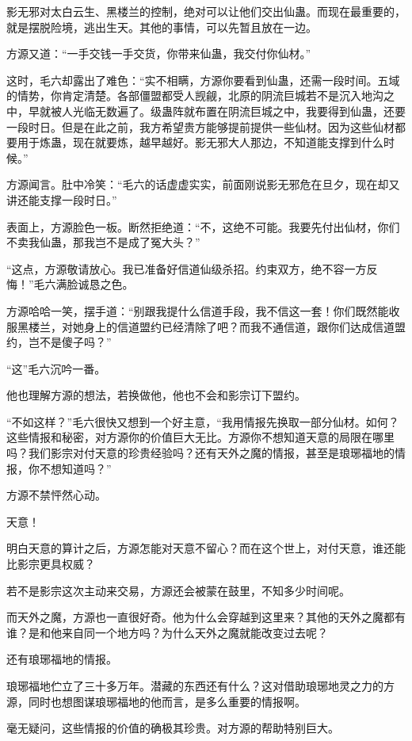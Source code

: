 \begin{this_body}
影无邪对太白云生、黑楼兰的控制，绝对可以让他们交出仙蛊。而现在最重要的，就是摆脱险境，逃出生天。其他的事情，可以先暂且放在一边。

方源又道：“一手交钱一手交货，你带来仙蛊，我交付你仙材。”

这时，毛六却露出了难色：“实不相瞒，方源你要看到仙蛊，还需一段时间。五域的情势，你肯定清楚。各部僵盟都受人觊觎，北原的阴流巨城若不是沉入地沟之中，早就被人光临无数遍了。级蛊阵就布置在阴流巨城之中，我要得到仙蛊，还要一段时日。但是在此之前，我方希望贵方能够提前提供一些仙材。因为这些仙材都要用于炼蛊，现在就要炼，越早越好。影无邪大人那边，不知道能支撑到什么时候。”

方源闻言。肚中冷笑：“毛六的话虚虚实实，前面刚说影无邪危在旦夕，现在却又讲还能支撑一段时日。”

表面上，方源脸色一板。断然拒绝道：“不，这绝不可能。我要先付出仙材，你们不卖我仙蛊，那我岂不是成了冤大头？”

“这点，方源敬请放心。我已准备好信道仙级杀招。约束双方，绝不容一方反悔！”毛六满脸诚恳之色。

方源哈哈一笑，摆手道：“别跟我提什么信道手段，我不信这一套！你们既然能收服黑楼兰，对她身上的信道盟约已经清除了吧？而我不通信道，跟你们达成信道盟约，岂不是傻子吗？”

“这”毛六沉吟一番。

他也理解方源的想法，若换做他，他也不会和影宗订下盟约。

“不如这样？”毛六很快又想到一个好主意，“我用情报先换取一部分仙材。如何？这些情报和秘密，对方源你的价值巨大无比。方源你不想知道天意的局限在哪里吗？我们影宗对付天意的珍贵经验吗？还有天外之魔的情报，甚至是琅琊福地的情报，你不想知道吗？”

方源不禁怦然心动。

天意！

明白天意的算计之后，方源怎能对天意不留心？而在这个世上，对付天意，谁还能比影宗更具权威？

若不是影宗这次主动来交易，方源还会被蒙在鼓里，不知多少时间呢。

而天外之魔，方源也一直很好奇。他为什么会穿越到这里来？其他的天外之魔都有谁？是和他来自同一个地方吗？为什么天外之魔就能改变过去呢？

还有琅琊福地的情报。

琅琊福地伫立了三十多万年。潜藏的东西还有什么？这对借助琅琊地灵之力的方源，同时也想图谋琅琊福地的他而言，是多么重要的情报啊。

毫无疑问，这些情报的价值的确极其珍贵。对方源的帮助特别巨大。


\end{this_body}
